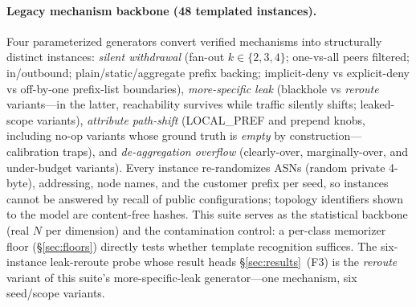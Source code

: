 \documentclass[11pt]{article}
\begin{document}
\paragraph{Legacy mechanism backbone (48 templated instances).} Four parameterized
generators convert verified mechanisms into structurally
distinct instances: \emph{silent withdrawal} (fan-out $k\in\{2,3,4\}$;
one-vs-all peers filtered; in/outbound; plain/static/aggregate prefix
backing; implicit-deny vs explicit-deny vs off-by-one prefix-list
boundaries), \emph{more-specific leak} (blackhole vs \emph{reroute}
variants---in the latter, reachability survives while traffic silently
shifts; leaked-scope variants), \emph{attribute path-shift} (LOCAL\_PREF and
prepend knobs, including no-op variants whose ground truth is \emph{empty}
by construction---calibration traps), and \emph{de-aggregation overflow}
(clearly-over, marginally-over, and under-budget variants). Every instance
re-randomizes ASNs (random private 4-byte), addressing, node names, and the
customer prefix per seed, so instances cannot be answered by recall of
public configurations; topology identifiers shown to the model are
content-free hashes. This suite serves as the statistical backbone (real $N$
per dimension) and the contamination control: a per-class memorizer floor
(\S\ref{sec:floors}) directly tests whether template recognition suffices.
The six-instance leak-reroute probe whose result heads \S\ref{sec:results}~(F3)
is the \emph{reroute} variant of this suite's more-specific-leak generator---one
mechanism, six seed/scope variants.
\end{document}
